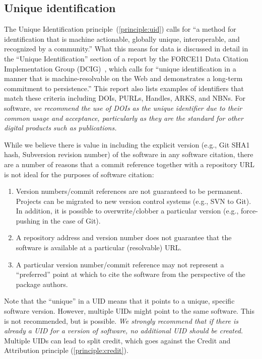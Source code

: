 \documentclass[12pt, oneside]{amsart}
\begin{document}
\subsection{Unique identification}
\label{sec:identification}

The Unique Identification principle~(\ref{principle:uid}) calls for ``a method for identification that is machine actionable, globally unique, interoperable, and recognized by a community.''
What this means for data is discussed in detail in the ``Unique Identification'' section of a report by the FORCE11 Data Citation Implementation Group (DCIG)~\cite{10.7717/peerj-cs.1}, which calls for ``unique identification in a manner that is machine-resolvable on the Web and demonstrates a long-term commitment to persistence.''
This report also lists examples of identifiers that match these criteria including DOIs, PURLs, Handles, ARKS, and NBNs.
For software, \textit{we recommend the use of DOIs as the unique identifier due to their common usage and acceptance, particularly as they are the standard for other digital products such as publications.}

While we believe there is value in including the explicit version (e.g., Git SHA1 hash, Subversion revision number) of the software in any software citation, there are a number of reasons that a commit reference together with a repository URL is not ideal for the purposes of software citation:

\begin{enumerate}
\item Version numbers/commit references are not guaranteed to be permanent. Projects can be migrated to new version control systems (e.g., SVN to Git). In addition, it is possible to overwrite/clobber a particular version (e.g., force-pushing in the case of Git).
\item A repository address and version number does not guarantee that the software is available at a particular (resolvable) URL.
\item A particular version number/commit reference may not represent a ``preferred'' point at which to cite the software from the perspective of the package authors.
\end{enumerate}

Note that the ``unique'' in a UID means that it points to a unique, specific software version. However, multiple UIDs might point to the same software.
This is not recommended, but is possible.
\textit{We strongly recommend that if there is already a UID for a version of software, no additional UID should be created.}
Multiple UIDs can lead to split credit, which goes against the Credit and Attribution principle (\ref{principle:credit}).
\end{document}

